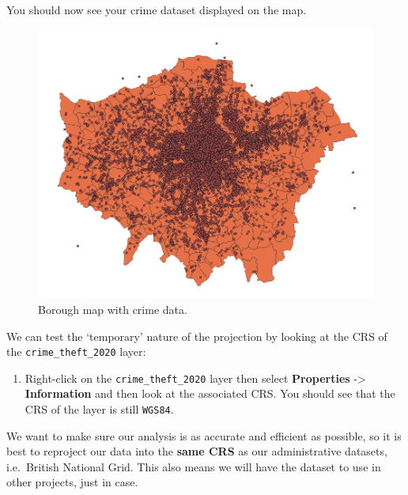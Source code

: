 \documentclass[
]{book}
\providecommand{\tightlist}{%
  \setlength{\itemsep}{0pt}\setlength{\parskip}{0pt}}
\begin{document}
You should now see your crime dataset displayed on the map.

\begin{figure}

{\centering \includegraphics[width=12.74in]{images/w03/crime_unproj} 

}

\caption{Borough map with crime data.}\label{fig:03-borough-crime}
\end{figure}

We can test the `temporary' nature of the projection by looking at the CRS of the \texttt{crime\_theft\_2020} layer:

\begin{enumerate}
\def\labelenumi{\arabic{enumi}.}
\setcounter{enumi}{3}
\tightlist
\item
  Right-click on the \texttt{crime\_theft\_2020} layer then select \textbf{Properties} -\textgreater{} \textbf{Information} and then look at the associated CRS. You should see that the CRS of the layer is still \texttt{WGS84}.
\end{enumerate}

We want to make sure our analysis is as accurate and efficient as possible, so it is best to reproject our data into the \textbf{same CRS} as our administrative datasets, i.e.~British National Grid. This also means we will have the dataset to use in other projects, just in case.
\end{document}
